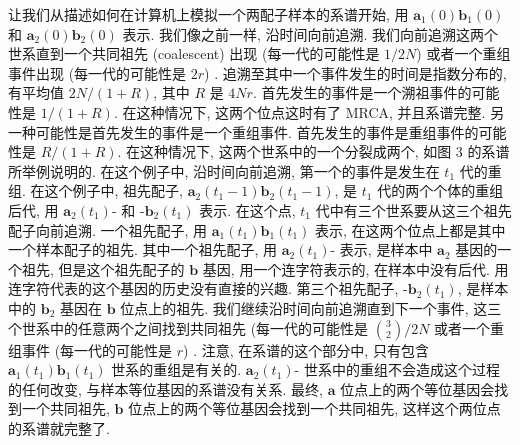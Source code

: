 \documentclass[12pt]{article}
\begin{document}
让我们从描述如何在计算机上模拟一个两配子样本的系谱开始, 用 $\mathbf{a}_{1}(0)\mathbf{b}_{1}(0)$ 和
$\mathbf{a}_{2}(0)\mathbf{b}_{2}(0)$ 表示. 我们像之前一样, 沿时间向前追溯. 我们向前追溯这两个世系直到一个共同祖先
(coalescent) 出现 (每一代的可能性是 $1/2N$) 或者一个重组事件出现 (每一代的可能性是 $2r$) .
追溯至其中一个事件发生的时间是指数分布的, 有平均值 $2N/(1+R)$, 其中 $R$ 是 $4Nr$.
首先发生的事件是一个溯祖事件的可能性是 $1/(1+R)$. 在这种情况下, 这两个位点这时有了 MRCA, 并且系谱完整.
另一种可能性是首先发生的事件是一个重组事件. 首先发生的事件是重组事件的可能性是 $R/(1+R)$. 在这种情况下,
这两个世系中的一个分裂成两个, 如图 3 的系谱所举例说明的. 在这个例子中, 沿时间向前追溯, 第一个的事件是发生在 $t_{1}$
代的重组. 在这个例子中, 祖先配子, $\mathbf{a}_{2}(t_{1}-1)\mathbf{b}_{2}(t_{1}-1)$, 是 $t_{1}$
代的两个个体的重组后代, 用 $\mathbf{a}_{2}(t_{1})\text{-}$ 和 $\text{-}\mathbf{b}_{2}(t_{1})$ 表示.
在这个点, $t_{1}$ 代中有三个世系要从这三个祖先配子向前追溯. 一个祖先配子, 用
$\mathbf{a}_{1}(t_{1})\mathbf{b}_{1}(t_{1})$ 表示, 在这两个位点上都是其中一个样本配子的祖先. 其中一个祖先配子,
用 $\mathbf{a}_{2}(t_{1})\text{-}$ 表示, 是样本中 $\mathbf{a}_{2}$ 基因的一个祖先, 但是这个祖先配子的
$\mathbf{b}$ 基因, 用一个连字符表示的, 在样本中没有后代. 用连字符代表的这个基因的历史没有直接的兴趣. 第三个祖先配子,
$\text{-}\mathbf{b}_{2}(t_{1})$, 是样本中的 $\mathbf{b}_{2}$ 基因在 $\mathbf{b}$ 位点上的祖先.
我们继续沿时间向前追溯直到下一个事件, 这三个世系中的任意两个之间找到共同祖先 (每一代的可能性是 $\binom{3}{2}/2N$
或者一个重组事件 (每一代的可能性是 $r$) . 注意, 在系谱的这个部分中, 只有包含
$\mathbf{a}_{1}(t_{1})\mathbf{b}_{1}(t_{1})$ 世系的重组是有关的. $\mathbf{a}_{2}(t_{1})\text{-}$
世系中的重组不会造成这个过程的任何改变, 与样本等位基因的系谱没有关系. 最终, $\mathbf{a}$
位点上的两个等位基因会找到一个共同祖先, $\mathbf{b}$ 位点上的两个等位基因会找到一个共同祖先,
这样这个两位点的系谱就完整了.
\end{document}
